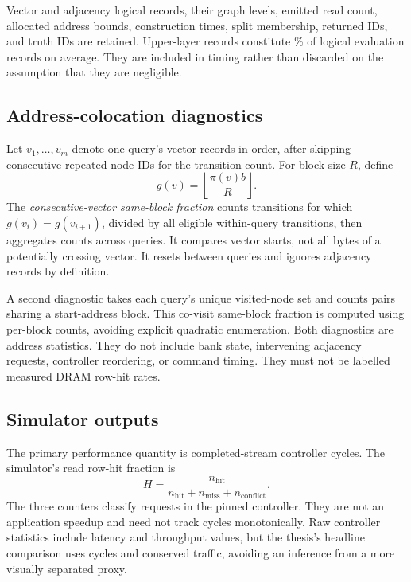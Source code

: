 \documentclass[11pt,a4paper]{report}
\begin{document}
Vector and adjacency logical records, their graph levels, emitted read count, allocated address bounds, construction times, split membership, returned IDs, and truth IDs are retained. Upper-layer records constitute \UpperFraction\% of logical evaluation records on average. They are included in timing rather than discarded on the assumption that they are negligible.

\subsection{Address-colocation diagnostics}
Let $v_1,\ldots,v_m$ denote one query's vector records in order, after skipping consecutive repeated node IDs for the transition count. For block size $R$, define
\begin{equation}
 g(v)=\left\lfloor\frac{\pi(v)b}{R}\right\rfloor.
\end{equation}
The \emph{consecutive-vector same-block fraction} counts transitions for which $g(v_i)=g(v_{i+1})$, divided by all eligible within-query transitions, then aggregates counts across queries. It compares vector starts, not all bytes of a potentially crossing vector. It resets between queries and ignores adjacency records by definition.

A second diagnostic takes each query's unique visited-node set and counts pairs sharing a start-address block. This co-visit same-block fraction is computed using per-block counts, avoiding explicit quadratic enumeration. Both diagnostics are address statistics. They do not include bank state, intervening adjacency requests, controller reordering, or command timing. They must not be labelled measured DRAM row-hit rates.

\subsection{Simulator outputs}
The primary performance quantity is completed-stream controller cycles. The simulator's read row-hit fraction is
\begin{equation}
 H=\frac{n_{\mathrm{hit}}}{n_{\mathrm{hit}}+n_{\mathrm{miss}}+n_{\mathrm{conflict}}}.
\end{equation}
The three counters classify requests in the pinned controller. They are not an application speedup and need not track cycles monotonically. Raw controller statistics include latency and throughput values, but the thesis's headline comparison uses cycles and conserved traffic, avoiding an inference from a more visually separated proxy.
\end{document}

